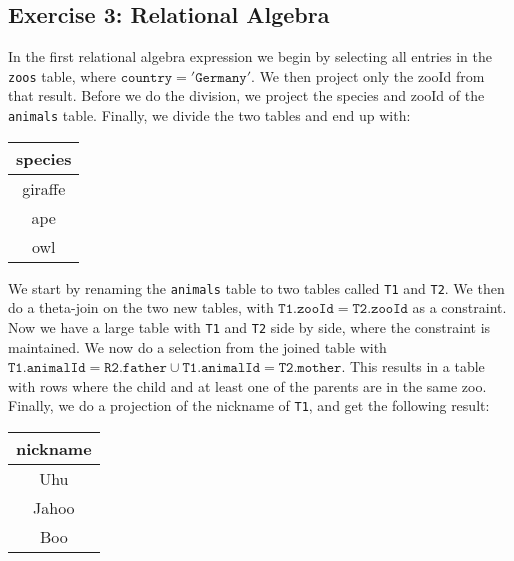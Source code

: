 \subsection{Exercise 3: Relational Algebra}

In the first relational algebra expression we begin by selecting all entries in the \texttt{zoos} table, where $\mathtt{country} = \mathtt{'Germany'}$.
We then project only the zooId from that result.
Before we do the division, we project the species and zooId of the \texttt{animals} table.
Finally, we divide the two tables and end up with:

\begin{center}
  \begin{tabular}{ c }
    \hline
    species \\  
    \hline
    giraffe \\
    ape \\
    owl \\
    \hline
  \end{tabular}
\end{center}

We start by renaming the \texttt{animals} table to two tables called \texttt{T1} and \texttt{T2}.
We then do a theta-join on the two new tables, with $\mathtt{T1.zooId} = \mathtt{T2.zooId}$ as a constraint.
Now we have a large table with \texttt{T1} and \texttt{T2} side by side, where the constraint is maintained.
We now do a selection from the joined table with $\mathtt{T1.animalId} = \mathtt{R2.father} \cup \mathtt{T1.animalId} = \mathtt{T2.mother}$.
This results in a table with rows where the child and at least one of the parents are in the same zoo.
Finally, we do a projection of the nickname of \texttt{T1}, and get the following result:

\begin{center}
  \begin{tabular}{ c }
    \hline
    nickname \\  
    \hline
    Uhu \\
    Jahoo \\
    Boo \\
    \hline
  \end{tabular}
\end{center}

